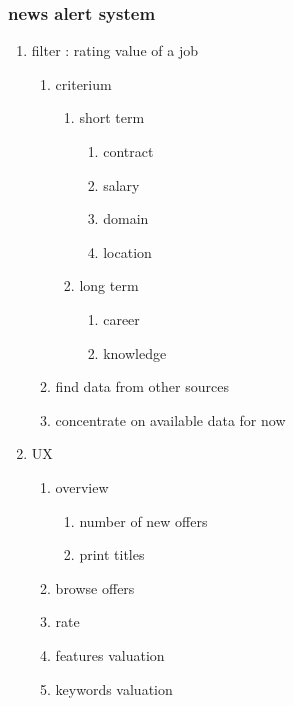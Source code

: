 \documentclass[11pt]{article}
\begin{document}
\subsubsection{news alert system}
\label{sec:org31d7839}
\begin{enumerate}
\item filter : rating value of a job
\label{sec:org1b6e8c1}
\begin{enumerate}
\item criterium
\label{sec:orga6c2763}
\begin{enumerate}
\item short term
\label{sec:orgc87fe97}
\begin{enumerate}
\item contract
\label{sec:orga06f97c}
\item salary
\label{sec:org5a8080a}
\item domain
\label{sec:org254c23e}
\item location
\label{sec:org5095899}
\end{enumerate}
\item long term
\label{sec:org48bd139}
\begin{enumerate}
\item career
\label{sec:org8717018}
\item knowledge
\label{sec:org7bc6af3}
\end{enumerate}
\end{enumerate}
\item find data from other sources
\label{sec:org36b0944}
\item concentrate on available data for now
\label{sec:orgad13777}
\end{enumerate}
\item UX
\label{sec:org90b7042}
\begin{enumerate}
\item overview
\label{sec:org4e0c4e0}
\begin{enumerate}
\item number of new offers
\label{sec:orgdf86dae}
\item print titles
\label{sec:orgea1e460}
\end{enumerate}
\item browse offers
\label{sec:orge9872a6}
\item rate
\label{sec:org87eb6ae}
\item features valuation
\label{sec:org41dc97d}
\item keywords valuation
\label{sec:org9162a7c}
\begin{enumerate}

\end{enumerate}
\end{enumerate}
\end{enumerate}
\end{document}
